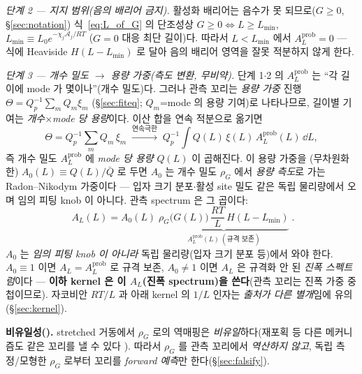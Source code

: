 \emph{단계 2 — 지지 범위(음의 배리어 금지).} 활성화 배리어는 음수가 못 되므로($G\ge0$, \S\ref{sec:notation})
식~\eqref{eq:L_of_G} 의 단조성상 $G\ge0\Leftrightarrow L\ge L_{\min}$, $L_{\min}\equiv L_0 e^{-\chi_j\mathcal A_j/RT}$
($G=0$ 대응 최단 길이)다. 따라서 $L<L_{\min}$ 에서 $A_L^{\mathrm{prob}}=0$ — 식에 Heaviside $H(L-L_{\min})$ 로
달아 음의 배리어 영역을 잘못 적분하지 않게 한다.

\emph{단계 3 — 개수 밀도 $\to$ 용량 가중(측도 변환, 무비약).} 단계 1$\cdot$2 의 $A_L^{\mathrm{prob}}$ 는 ``각 길이에
mode 가 몇이나''(개수 밀도)다. 그러나 관측 꼬리는 \emph{용량 가중} 진행 $\Theta=Q_p^{-1}\sum_m Q_m\xi_m$
(\S\ref{sec:fiteq}; $Q_m$=mode 의 용량 기여)로 나타나므로, 길이별 기여는 \emph{개수}$\times$\emph{mode 당 용량}이다.
이산 합을 연속 적분으로 옮기면
\begin{equation*}
\Theta=Q_p^{-1}\sum_m Q_m\,\xi_m\;\xrightarrow{\text{연속극한}}\;Q_p^{-1}\!\int Q(L)\,\xi(L)\,A_L^{\mathrm{prob}}(L)\,\dd L,
\end{equation*}
즉 개수 밀도 $A_L^{\mathrm{prob}}$ 에 \emph{mode 당 용량} $Q(L)$ 이 곱해진다. 이 용량 가중을 (무차원화한)
$A_0(L)\equiv Q(L)/\bar Q$ 로 두면 $A_0$ 는 개수 밀도 $\rho_G$ 에서 \emph{용량 측도}로 가는 Radon--Nikodym
가중이다 — 입자 크기 분포$\cdot$활성 site 밀도 같은 독립 물리량에서 오며 임의 피팅 knob 이 아니다. 관측 spectrum 은
그 곱이다:
\begin{equation}
\boxed{\;A_L(L)=A_0(L)\;\underbrace{\rho_G\big(G(L)\big)\,\frac{RT}{L}\,H(L-L_{\min})}_{\displaystyle A_L^{\mathrm{prob}}(L)\ (\text{규격 보존})}\;.}
\label{eq:spectrum}
\end{equation}
$A_0$ 는 \emph{임의 피팅 knob 이 아니라} 독립 물리량(입자 크기 분포 등)에서 와야 한다. $A_0\equiv1$ 이면
$A_L=A_L^{\mathrm{prob}}$ 로 규격 보존, $A_0\ne1$ 이면 $A_L$ 은 규격화 안 된 \emph{진폭 스펙트럼}이다 — \textbf{이하
kernel 은 이 $A_L$(진폭 spectrum)을 쓴다}(관측 꼬리는 진폭 가중 중첩이므로). 자코비안 $RT/L$ 과 아래 kernel 의
$1/L$ 인자는 \emph{출처가 다른 별개}임에 유의(\S\ref{sec:kernel}).
\begin{boundbox}
\textbf{비유일성().} stretched 거동에서 $\rho_G$ 로의 역매핑은 \emph{비유일}하다(재포획 등 다른
메커니즘도 같은 꼬리를 낼 수 있다 \cite{baessler1993}). 따라서 $\rho_G$ 를 관측 꼬리에서 \emph{역산하지
않고}, 독립 측정/모형한 $\rho_G$ 로부터 꼬리를 \emph{forward 예측}만 한다(\S\ref{sec:falsify}).
\end{boundbox}

